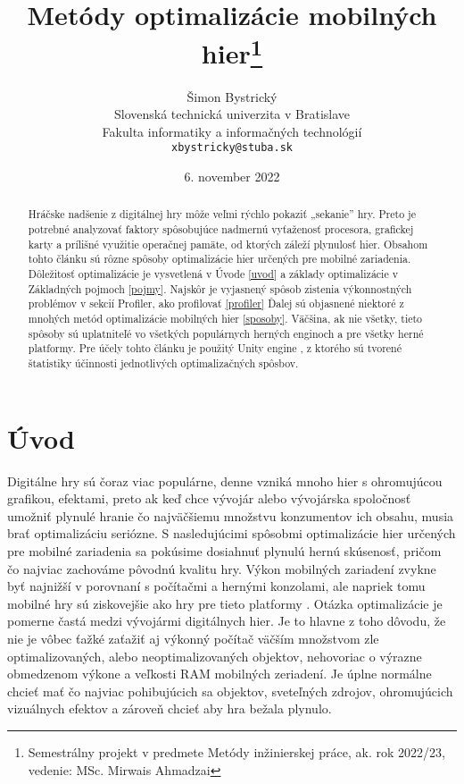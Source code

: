 \documentclass[10pt,twoside,slovak,a4paper]{article}
\title{Metódy optimalizácie mobilných hier\thanks{Semestrálny projekt v predmete Metódy inžinierskej práce, ak. rok 2022/23, vedenie: MSc. Mirwais Ahmadzai}}
\author{Šimon Bystrický\\[2pt]
	{\small Slovenská technická univerzita v Bratislave}\\
	{\small Fakulta informatiky a informačných technológií}\\
	{\small \texttt{xbystricky@stuba.sk}}
	}
\date{\small 6. november 2022}
\begin{document}
\maketitle

\begin{abstract}
Hráčske nadšenie z digitálnej hry môže veľmi rýchlo pokaziť „sekanie” hry. Preto je potrebné analyzovať faktory spôsobujúce nadmernú vyťaženosť procesora, grafickej karty a prílišné využitie operačnej pamäte, od ktorých záleží plynulosť hier.
Obsahom tohto článku sú rôzne spôsoby optimalizácie hier určených pre mobilné zariadenia. Dôležitosť optimalizácie je vysvetlená v Úvode \ref{uvod} a základy optimalizácie v Základných pojmoch \ref{pojmy}. Najskôr je vyjasnený spôsob zistenia výkonnostných problémov v sekcií Profiler, ako profilovať \ref{profiler} Ďalej sú objasnené niektoré z mnohých metód optimalizácie mobilných hier \ref{sposoby}. Väčšina, ak nie všetky, tieto spôsoby sú uplatniteľé vo všetkých populárnych herných
enginoch a pre všetky herné platformy. Pre účely tohto článku je použitý Unity engine \cite{Unity}, z ktorého sú tvorené štatistiky účinnosti jednotlivých optimalizačných spôsbov.
\end{abstract}



\section{Úvod}

Digitálne hry sú čoraz viac populárne, denne vzniká mnoho hier s ohromujúcou grafikou, efektami, preto ak keď chce vývojár alebo vývojárska spoločnosť umožniť plynulé hranie čo najväčšiemu množstvu konzumentov ich obsahu,
musia brať optimalizáciu seriózne. S nasledujúcimi spôsobmi optimalizácie hier určených pre mobilné zariadenia sa pokúsime
dosiahnuť plynulú hernú skúsenosť, pričom čo najviac zachováme pôvodnú kvalitu hry.
Výkon mobilných zariadení zvykne byť najnižší v porovnaní s počítačmi a hernými konzolami, ale napriek tomu mobilné hry sú ziskovejšie ako hry pre tieto platformy \cite{venturebeat-revenue}.
Otázka optimalizácie je pomerne častá medzi vývojármi digitálnych hier. Je to hlavne z toho dôvodu, že nie je vôbec ťažké
zaťažiť aj výkonný počítač väčším množstvom zle optimalizovaných, alebo neoptimalizovaných objektov, nehovoriac o výrazne obmedzenom výkone a veľkosti RAM mobilných zeriadení.
Je úplne normálne chcieť mať čo najviac pohibujúcich sa objektov, sveteľných zdrojov, ohromujúcich vizuálnych efektov a zároveň chcieť aby hra bežala plynulo.
\end{document}
